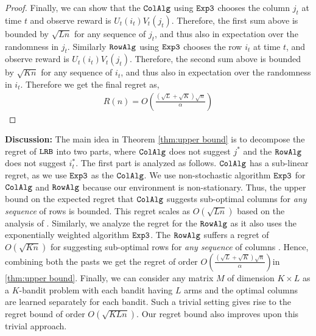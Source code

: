 \begin{proof}

Finally, we can show that the ${\tt ColAlg}$ using ${\tt Exp3}$ chooses the column $j_t$ at time $t$ and observe reward is $U_t(i_t) V_t(j_t)$. Therefore, the first sum above is bounded by $\sqrt{L n}$ for any sequence of $j_t$, and thus also in expectation over the randomness in $j_t$. Similarly ${\tt RowAlg}$ using ${\tt Exp3}$ chooses the row $i_t$ at time $t$, and observe reward is $U_t(i_t) V_t(j_t)$. Therefore, the second sum above is bounded by $\sqrt{K n}$ for any sequence of $i_t$, and thus also in expectation over the randomness in $i_t$. Therefore we get the final regret as,
\begin{align*}
  R(n) = O\left(\frac{\left(\sqrt{L } + \sqrt{K }\right)\sqrt{n}}{\alpha}\right)
\end{align*}
\end{proof}





\textbf{Discussion:} The main idea in Theorem \ref{thm:upper bound} is to decompose the regret of ${\tt LRB}$ into two parts, where ${\tt ColAlg}$ does not suggest $j^*$ and the ${\tt RowAlg}$ does not suggest $i^*_t$. The first part is analyzed as follows. ${\tt ColAlg}$ has a sub-linear regret, as we use ${\tt Exp3}$ as the ${\tt ColAlg}$. We use non-stochastic algorithm ${\tt Exp3}$ for ${\tt ColAlg}$ and ${\tt RowAlg}$ because our environment is non-stationary. Thus, the upper bound on the expected regret that ${\tt ColAlg}$ suggests sub-optimal columns for \emph{any sequence} of rows is bounded. This regret scales as $O(\sqrt{L n})$ based on the analysis of \citet{auer2002nonstochastic}. Similarly, we analyze the regret for the ${\tt RowAlg}$ as it also uses the exponentially weighted algorithm ${\tt Exp3}$. The ${\tt RowAlg}$ suffers a regret of $O(\sqrt{K n})$ for suggesting sub-optimal rows for \emph{any sequence} of columns . Hence, combining both the pasts we get the regret of order $O\left(\frac{\left(\sqrt{L } + \sqrt{K }\right)\sqrt{n}}{\alpha}\right) $in \cref{thm:upper bound}. Finally, we can consider any matrix $M$ of dimension $K\times L$ as a $K$-bandit problem with each bandit having $L$ arms and the optimal columns are learned separately for each bandit. Such a trivial setting gives rise to the regret bound of order $O(\sqrt{K L n})$. Our regret bound also improves upon this trivial approach.

